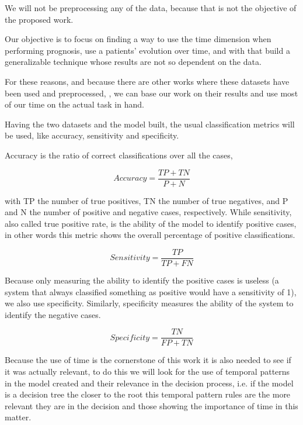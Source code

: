 We will not be preprocessing any of the data, because that is not the objective of the proposed work. 

Our objective is to focus on finding a way to use the time dimension when performing prognosis, use a patients’ evolution over time, and with
that build a generalizable technique whose results are not so dependent on the data.

For these reasons, and because there are other works where these datasets have been used and preprocessed, \cite{Watanabe2003}, we can base our work on their results and use most of our time on the actual task in hand. 

Having the two datasets and the model built, the usual classification metrics will be used, like accuracy, sensitivity and specificity.

Accuracy is the ratio of correct classifications over all the cases,

\begin{equation}
Accuracy=\frac{TP+TN}{P+N}
\label{eq:accuracy}
\end{equation} 

with TP the number of true positives, TN the number of true negatives, and P and N the number of positive and negative cases, respectively.
While sensitivity, also called true positive rate, is the ability of the model to identify positive cases, in other words this metric shows the overall percentage of positive classifications.


\begin{equation}
Sensitivity= \frac{ TP}{TP+FN}
\label{eq:sensitivity}
\end{equation} 

Because only measuring the ability to identify the positive cases is useless (a system that always classified something as positive would have a sensitivity of 1), we also use specificity. Similarly, specificity measures the ability of the system to identify the negative cases.

\begin{equation}
Specificity= \frac{ TN}{FP+TN}
\label{eq:specificity}
\end{equation} 

Because the use of time is the cornerstone of this work it is also needed to see if it was actually relevant, to do this we will look for the use of temporal patterns in the model created and their relevance in the decision process, i.e. if the model is a decision tree the closer to the root this temporal pattern rules are the more relevant they are in the decision and those showing the importance of time in this matter.

